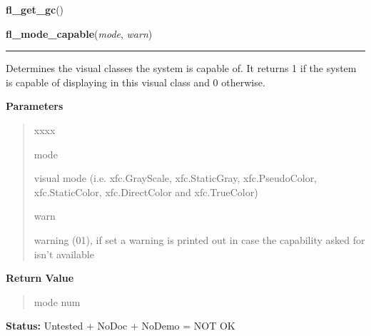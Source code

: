     \label{xformslib:library:fl_get_gc}

    \vspace{0.5ex}

\hspace{.8\funcindent}\begin{boxedminipage}{\funcwidth}

    \raggedright \textbf{fl\_get\_gc}()

\setlength{\parskip}{2ex}
\setlength{\parskip}{1ex}
    \end{boxedminipage}

    \label{xformslib:library:fl_mode_capable}

    \vspace{0.5ex}

\hspace{.8\funcindent}\begin{boxedminipage}{\funcwidth}

    \raggedright \textbf{fl\_mode\_capable}(\textit{mode}, \textit{warn})

    \vspace{-1.5ex}

    \rule{\textwidth}{0.5\fboxrule}
\setlength{\parskip}{2ex}
    Determines the visual classes the system is capable of. It returns 1 if
    the system is capable of displaying in this visual class and 0 
    otherwise.

\setlength{\parskip}{1ex}
      \textbf{Parameters}
      \vspace{-1ex}

      \begin{quote}
        \begin{Ventry}{xxxx}

          \item[mode]

          visual mode (i.e. xfc.GrayScale, xfc.StaticGray, xfc.PseudoColor,
          xfc.StaticColor, xfc.DirectColor and xfc.TrueColor)

          \item[warn]

          warning (0{\textbar}1), if set a warning is printed out in case 
          the capability asked for isn't available

        \end{Ventry}

      \end{quote}

      \textbf{Return Value}
    \vspace{-1ex}

      \begin{quote}
      mode num

      \end{quote}

\textbf{Status:} Untested + NoDoc + NoDemo = NOT OK



    \end{boxedminipage}

